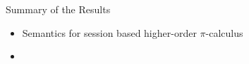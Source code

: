\documentclass{beamer}
\begin{document}
	\begin{frame}{Summary of the Results}
		\begin{itemize}
			\item	Semantics for session based higher-order $\pi$-calculus
			\item	
		\end{itemize}
	\end{frame}


%
%
%
	
\end{document}
